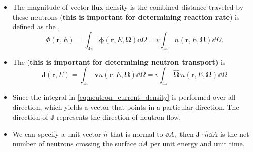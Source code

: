\documentclass[a4paper]{article}
\begin{document}
\begin{itemize}
    \item The magnitude of vector flux density is the combined distance traveled by these neutrons (\textbf{this is important for determining reaction rate}) is defined as the ,\begin{equation}
        \Phi(\mathbf r,E)=\int_{4\pi}\mathbf\phi(\mathbf r, E,\mathbf\Omega)\dd\Omega=v\int_{4\pi}n(\mathbf r, E,\mathbf\Omega)\dd\Omega.
    \end{equation}
    \item The  (\textbf{this is important for determining neutron transport}) is\begin{equation}
        \mathbf J(\mathbf r,E)=\int_{4\pi}\mathbf vn(\mathbf r,E,\mathbf\Omega)\dd\Omega=v\int_{4\pi}\hat{\mathbf\Omega}\, n(\mathbf r,E,\mathbf\Omega)\dd\Omega\label{eq:neutron_current_density}
    \end{equation}
    \item Since the integral in \eqref{eq:neutron_current_density} is performed over all direction, which yields a vector that points in a particular direction. The direction of $\mathbf J$ represents the direction of  neutron flow.
    \item We can specify a unit vector $\hat n$ that is normal to $\dd A,$ then $\mathbf J\cdot\hat n\dd A$ is the net number of neutrons crossing the surface $\dd A$ per unit energy and unit time.
\end{itemize}
\end{document}
